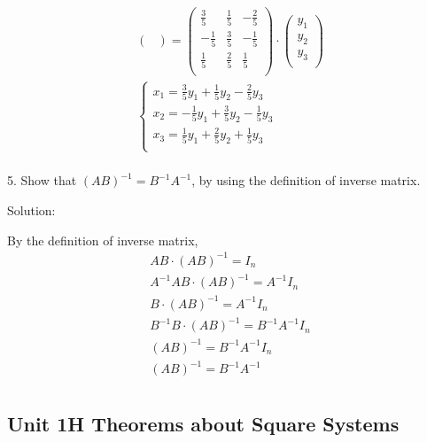 \documentclass{article}
\begin{document}
\begin{gather*}
\begin{pmatrix}
  \end{pmatrix} = 
  \begin{pmatrix}
    \frac{3}{5} & \frac{1}{5} & -\frac{2}{5} \\
    -\frac{1}{5} & \frac{3}{5} & -\frac{1}{5} \\
    \frac{1}{5} & \frac{2}{5} & \frac{1}{5} \\ 
  \end{pmatrix} \cdot
  \begin{pmatrix}
    y_1 \\
    y_2 \\
    y_3 \\
  \end{pmatrix} \\
  \begin{cases}
    x_1 = \frac{3}{5}y_1 + \frac{1}{5}y_2 - \frac{2}{5}y_3 \\
    x_2 = -\frac{1}{5}y_1 + \frac{3}{5}y_2 - \frac{1}{5}y_3 \\
    x_3 = \frac{1}{5}y_1 + \frac{2}{5}y_2 + \frac{1}{5}y_3 \\ 
  \end{cases} \\
\end{gather*}

5. Show that $(AB)^{-1} = B^{-1}A^{-1}$, by using the definition of inverse 
matrix.

Solution:

By the definition of inverse matrix,
\begin{gather*}
  AB \cdot (AB)^{-1} = I_n \\
  A^{-1}AB \cdot (AB)^{-1} = A^{-1}I_n \\
  B \cdot (AB)^{-1} = A^{-1}I_n \\
  B^{-1}B \cdot (AB)^{-1} = B^{-1}A^{-1}I_n \\
  (AB)^{-1} = B^{-1}A^{-1}I_n \\
  (AB)^{-1} = B^{-1}A^{-1} \\
\end{gather*}

\subsection*{Unit 1H Theorems about Square Systems}
\end{document}
